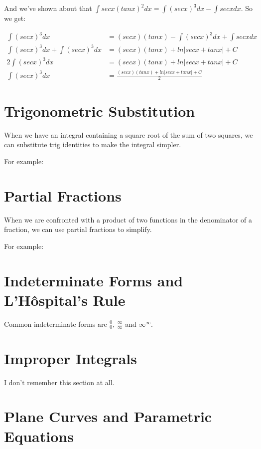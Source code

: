 \documentclass{article}
\begin{document}
And we've shown about that $\int secx (tanx)^2 dx = \int (secx)^3 dx -
\int secx dx$.  So we get:

\begin{align*}
  \int (secx)^3 dx &= (secx)(tanx) - \int (secx)^3 dx + \int secx dx \\
  \int (secx)^3 dx + \int (secx)^3 dx &=
  (secx)(tanx) + ln \left| secx + tanx \right| + C \\
  2 \int (secx)^3 dx &= (secx)(tanx) + ln \left| secx + tanx \right| + C \\
  \int (secx)^3 dx &= \frac{(secx)(tanx) + ln \left| secx + tanx \right| + C}{2}
\end{align*}

\section{Trigonometric Substitution}

When we have an integral containing a square root of the sum of two
squares, we can substitute trig identities to make the integral simpler.

For example:

\section{Partial Fractions}

When we are confronted with a product of two functions in the
denominator of a fraction, we can use partial fractions to simplify.

For example:

\section{Indeterminate Forms and L'H\^{o}spital's Rule}

Common indeterminate forms are $\frac{0}{0}$, $\frac{\infty}{\infty}$
and $\infty^\infty$.

\section{Improper Integrals}

I don't remember this section at all.

\section{Plane Curves and Parametric Equations}
\end{document}
